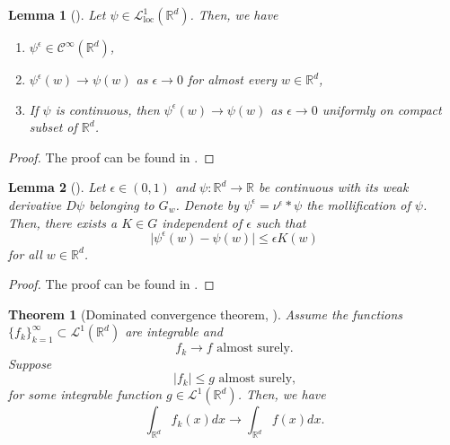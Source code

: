 \documentclass[12pt]{article}
\newtheorem{theorem}{Theorem}[section]
\newtheorem{lemma}[lemma]{Lemma}
\theoremstyle{definition}
\numberwithin{equation}{section}
\newcommand{\R}{\mathbb{R}}
\newcommand{\CL}{\mathcal{L}}
\newcommand{\CC}{\mathcal{C}}
\newcommand{\moll}{\nu^{\epsilon}}
\begin{document}
\begin{lemma}[]
  \label{lemma:mollifiers}
  Let $\psi \in \CL^1_{\text{loc}}(\R^d)$. Then, we have
  \begin{enumerate}[label=(\roman*)]
    \item $\psi^{\epsilon} \in \CC^{\infty}(\R^d)$,
    \item $\psi^{\epsilon}(w) \rightarrow \psi(w)$ as $\epsilon \rightarrow 0$ for almost every $w \in \R^d$,
    \item If $\psi$ is continuous, then $\psi^{\epsilon}(w) \rightarrow \psi(w)$ as $\epsilon \rightarrow 0$ uniformly on compact subset of $\R^d$.
  \end{enumerate}
\end{lemma}
\begin{proof}
  The proof can be found in \cite[pp. 630]{evansPartialDifferentialEquations2010}.
\end{proof}
\begin{lemma}[]
  \label{lemma:mollifier_bound}
  Let $\epsilon \in (0,1)$ and $\psi : \R^d \rightarrow \R$ be continuous with its weak derivative $D\psi$ belonging to $G_w$. Denote by $\psi^{\epsilon}  = \moll * \psi$ the mollification of $\psi$. Then, there exists a $K \in G$ independent of $\epsilon$ such that
  \begin{equation*}
    \lvert\psi^{\epsilon}(w) - \psi(w)\rvert \leq \epsilon K(w)
  \end{equation*}
  for all $w \in \R^d$.
\end{lemma}
\begin{proof}
  The proof can be found in 
  \cite{liStochasticModifiedEquations2019}.
\end{proof}
\begin{theorem}[Dominated convergence theorem, ]
  \label{thm:dominated_convergence}
  Assume the functions $\{f_k\}_{k=1}^{\infty} \subset \CL^1(\R^d)$ are integrable and
  \begin{equation*}
    f_k \rightarrow f \text{ almost surely.}
  \end{equation*}
  Suppose
  \begin{equation*}
    |f_k| \leq g \text{ almost surely,}
  \end{equation*}
  for some integrable function $g \in \CL^1(\R^d)$. Then, we have
  \begin{equation*}
    \int_{\R^d} f_k(x) dx \rightarrow \int_{\R^d} f(x) dx.
  \end{equation*}
\end{theorem}
\end{document}
